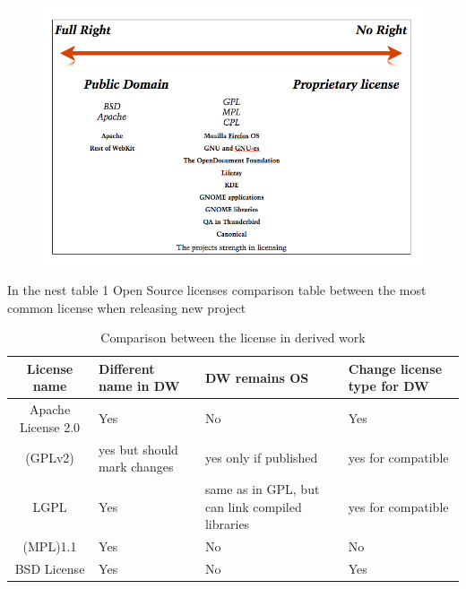 \documentclass[11pt]{article} %
\begin{document}
\begin{figure}[H]
    \centering
    \includegraphics[width=\textwidth]{Theprojects}
    \caption{}
    \label{}
\end{figure}

In the nest table 1 Open Source licenses comparison table between the most common license when releasing new project
\begin{table}[ht]
\caption{Comparison between the license in derived work}
\centering
\begin{tabular}{c  m{3cm}  m{4cm} m{3cm}}
\hline\hline

License name & Different name in  DW & DW remains OS & Change license type for DW \\ [3ex]

\hline
Apache License 2.0&Yes&No&Yes \\
(GPLv2)& yes but should mark changes & yes only if published& yes for compatible \\
LGPL&Yes& same as in GPL, but can link compiled libraries & yes for compatible \\
(MPL)1.1 & Yes & No & No \\
BSD License & Yes & No & Yes \\ [1ex]
\hline\hline
\end{tabular}
\label{table:nonlin}
\end{table}

\newpage
\end{document}
